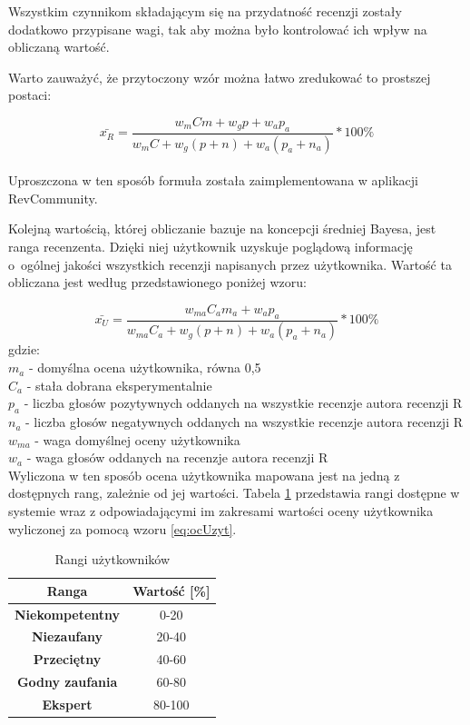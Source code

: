 Wszystkim czynnikom składającym się na przydatność recenzji zostały dodatkowo przypisane wagi, tak aby można było kontrolować ich wpływ na obliczaną wartość.

Warto zauważyć, że przytoczony wzór można łatwo zredukować to prostszej postaci:

\begin{equation}\label{eq:przydatnosc}
\bar{x_{R}}=\frac{w_{m}Cm+w_{g}{p}+w_{a}p_{a}}{w_{m}C+w_{g}(p+n)+w_{a}(p_{a}+n_{a})}*100\%
\end{equation}\\

Uproszczona w ten sposób formuła została zaimplementowana w aplikacji RevCommunity.

Kolejną wartością, której obliczanie bazuje na koncepcji średniej Bayesa, jest ranga recenzenta. Dzięki niej użytkownik uzyskuje poglądową informację o~ogólnej jakości wszystkich recenzji napisanych przez użytkownika. Wartość ta obliczana jest według przedstawionego poniżej wzoru:

\begin{equation}\label{eq:ocUzyt}
\bar{x_{U}}=\frac{w_{ma}C_{a}m_{a}+w_{a}p_{a}}{w_{ma}C_{a}+w_{g}(p+n)+w_{a}(p_{a}+n_{a})}*100\%
\end{equation}
gdzie:\\
$m_{a}$ - domyślna ocena użytkownika, równa 0,5\\
$C_{a}$ - stała dobrana eksperymentalnie\\
$p_{a}$ - liczba głosów pozytywnych oddanych na wszystkie recenzje autora recenzji R\\
$n_{a}$ - liczba głosów negatywnych oddanych na wszystkie recenzje autora recenzji R\\
$w_{ma}$ - waga domyślnej oceny użytkownika\\
$w_{a}$ - waga głosów oddanych na recenzje autora recenzji R\\

Wyliczona w ten sposób ocena użytkownika mapowana jest na jedną z dostępnych rang, zależnie od jej wartości. Tabela \ref{tab:rangi} przedstawia rangi dostępne w systemie wraz z odpowiadającymi im zakresami wartości oceny użytkownika wyliczonej za pomocą wzoru \ref{eq:ocUzyt}.

\begin{table}[H]
\centering
\begin{tabular}{|c||c|}  
\hline
\textbf{Ranga} & \textbf{Wartość [\%]} \\
\hline\hline
\textbf{Niekompetentny} & 0-20 \\  
\hline
\textbf{Niezaufany} & 20-40 \\  
\hline
\textbf{Przeciętny} & 40-60 \\  
\hline
\textbf{Godny zaufania} & 60-80 \\  
\hline
\textbf{Ekspert} & 80-100 \\  
\hline
\end{tabular}
\caption{Rangi użytkowników}\label{tab:rangi}
\end{table}


